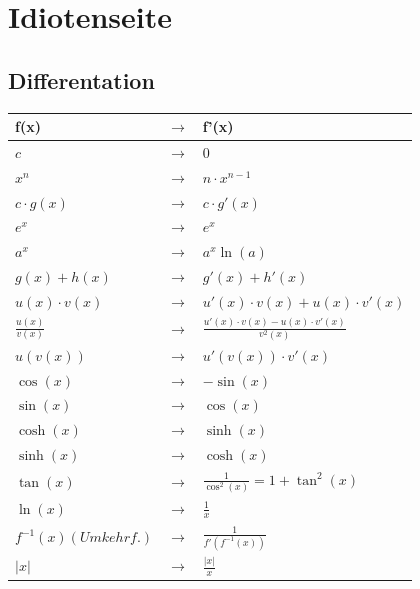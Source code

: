 \section{Idiotenseite}
\subsection{Differentation}

{\setlength{\extrarowheight}{4pt}
	\begin{tabular}{@{}lcl@{}}
		\textbf{f(x)} & $\rightarrow$ & \textbf{f'(x)} \\
		\toprule
		$c$ & $\rightarrow$ & $0$ \\
		$x^n$  & $\rightarrow$ & $n\cdot x^{n-1}$ \\
		$c\cdot g\left(x\right)$  & $\rightarrow$ & $c\cdot g'\left(x\right)$ \\
		$e^x$  & $\rightarrow$ & $e^x$ \\
		$a^x$ & $\rightarrow$ & $a^x\ln(a)$\\
		\midrule
		$g\left(x\right)+h\left(x\right)$  & $\rightarrow$ & $g'\left(x\right)+h'\left(x\right)$ \\
		$u\left(x\right)\cdot v\left(x\right)$  & $\rightarrow$ & $u'\left(x\right)\cdot v\left(x\right)+u\left(x\right)\cdot v'\left(x\right)$ \\ 
		$\frac{u\left(x\right)}{v\left(x\right)}$  & $\rightarrow$ & $\frac{u'\left(x\right)\cdot v\left(x\right)-u\left(x\right)\cdot v'\left(x\right)}{v^2\left(x\right)}$ \\
		$u\left(v\left(x\right)\right)$  & $\rightarrow$ & $u'\left(v\left(x\right)\right)\cdot v'\left(x\right)$ \\
		\midrule
		$\cos\left(x\right)$ & $\rightarrow$ & $-\sin(x)$ \\
		$\sin\left(x\right)$ & $\rightarrow$ & $\cos(x)$ \\	
		$\cosh\left(x\right)$ & $\rightarrow$ & $\sinh(x)$ \\
		$\sinh\left(x\right)$ & $\rightarrow$ & $\cosh(x)$ \\
		$\tan\left(x\right)$ & $\rightarrow$ & $\frac{1}{\cos^2(x)} = 1 + \tan^2(x)$ \\	
		$\ln\left(x\right)$ & $\rightarrow$ & $\frac{1}{x}$ \\
		$f^{-1}\left(x\right) {\scriptscriptstyle (Umkehrf.)}$  & $\rightarrow$ & $\frac{1}{f'(f^{-1}(x))}$ \\
		$\left|x\right|$ & $\rightarrow$ & $\frac{\left|x\right|}{x}$ \\
	\end{tabular}
}

